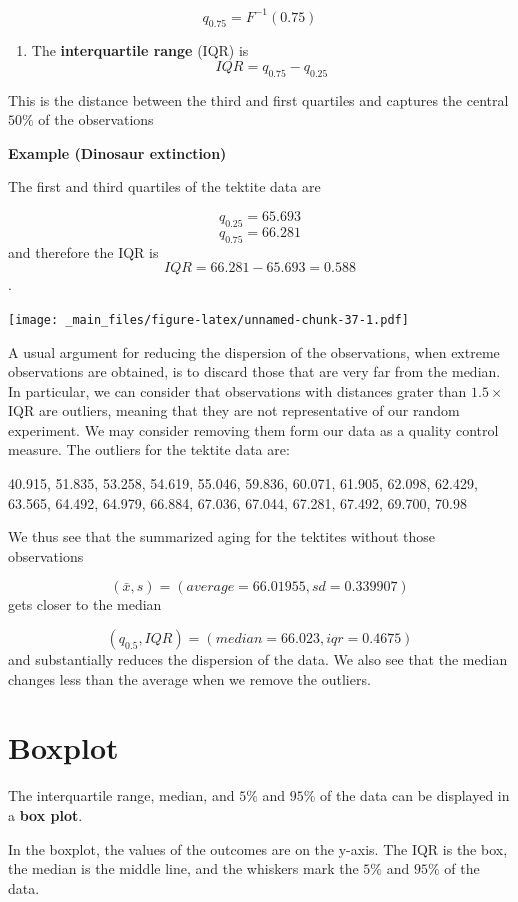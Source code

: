 \documentclass[
]{book}
\providecommand{\tightlist}{%
  \setlength{\itemsep}{0pt}\setlength{\parskip}{0pt}}
\begin{document}
\[q_{0.75}=F^{-1}(0.75)\]

\begin{enumerate}
\def\labelenumi{\arabic{enumi})}
\setcounter{enumi}{2}
\tightlist
\item
  The \textbf{interquartile range} (IQR) is \[IQR=q_{0.75} - q_{0.25}\]
\end{enumerate}

This is the distance between the third and first quartiles and captures the central \(50\%\) of the observations

\textbf{Example (Dinosaur extinction)}

The first and third quartiles of the tektite data are

\[q_{0.25}=65.693\]
\[q_{0.75}=66.281\]
and therefore the IQR is \[IQR=66.281-65.693=0.588\].

\texttt{[image: \_main\_files/figure-latex/unnamed-chunk-37-1.pdf]}

A usual argument for reducing the dispersion of the observations, when extreme observations are obtained, is to discard those that are very far from the median. In particular, we can consider that observations with distances grater than \(1.5\times\)IQR are outliers, meaning that they are not representative of our random experiment. We may consider removing them form our data as a quality control measure. The outliers for the tektite data are:

40.915, 51.835, 53.258, 54.619, 55.046, 59.836, 60.071, 61.905, 62.098, 62.429, 63.565, 64.492, 64.979, 66.884, 67.036, 67.044, 67.281, 67.492, 69.700, 70.98

We thus see that the summarized aging for the tektites without those observations

\[(\bar{x}, s)= (average=66.01955, sd=0.339907)\]
gets closer to the median

\[(q_{0.5}, IQR)= (median=66.023, iqr=0.4675)\]
and substantially reduces the dispersion of the data. We also see that the median changes less than the average when we remove the outliers.

\hypertarget{boxplot}{%
\section{Boxplot}\label{boxplot}}

The interquartile range, median, and \(5\%\) and \(95\%\) of the data can be displayed in a \textbf{box plot}.

In the boxplot, the values of the outcomes are on the y-axis. The IQR is the box, the median is the middle line, and the whiskers mark the \(5\%\) and \(95\%\) of the data.
\end{document}
